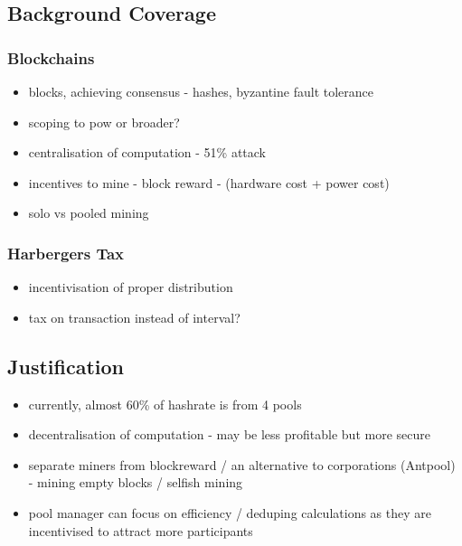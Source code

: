 \subsection{Background Coverage}

\subsubsection{Blockchains}

\begin{itemize}
  \item blocks, achieving consensus - hashes, byzantine fault tolerance
  \item scoping to pow or broader?
  \item centralisation of computation - 51\% attack
  \item incentives to mine - block reward - (hardware cost + power cost)
  \item solo vs pooled mining
\end{itemize}

\subsubsection{Harbergers Tax}

\begin{itemize}
  \item incentivisation of proper distribution
  \item tax on transaction instead of interval?
\end{itemize}

\subsection{Justification} %

\begin{itemize}
  \item currently, almost 60\% of hashrate is from 4 pools %
  \item decentralisation of computation - may be less profitable but more secure
  \item separate miners from blockreward / an alternative to corporations (Antpool) - mining empty blocks / selfish mining
  \item pool manager can focus on efficiency / deduping calculations as they are incentivised to attract more participants
\end{itemize}

